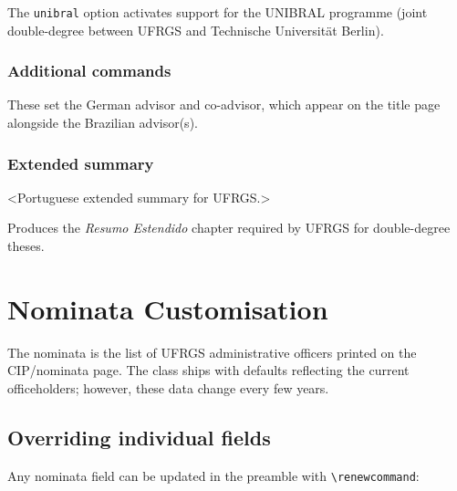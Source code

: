 \documentclass[11pt,a4paper]{article}
\newcommand{\opt}[1]{\texttt{#1}}
\newcommand{\cmd}[1]{\texttt{\textbackslash #1}}
\begin{document}
The \opt{unibral} option activates support for the UNIBRAL programme
(joint double-degree between UFRGS and Technische Universität Berlin).

\subsubsection{Additional commands}

\begin{latex}
\end{latex}

These set the German advisor and co-advisor, which appear on the title
page alongside the Brazilian advisor(s).

\subsubsection{Extended summary}

\begin{latex}
\extendedsummary
<Portuguese extended summary for UFRGS.>
\end{latex}

Produces the \emph{Resumo Estendido} chapter required by UFRGS for
double-degree theses.

\section{Nominata Customisation}
\label{sec:nominata}

The nominata is the list of UFRGS administrative officers printed on
the CIP/nominata page.  The class ships with defaults reflecting the
current officeholders; however, these data change every few years.

\subsection{Overriding individual fields}

Any nominata field can be updated in the preamble with
\cmd{renewcommand}:

\begin{latex}
\renewcommand{\nominataReit}{Prof\textsuperscript{a}.~Ana Silva}
\renewcommand{\nominataReitname}{Reitora}
\end{latex}
\end{document}
